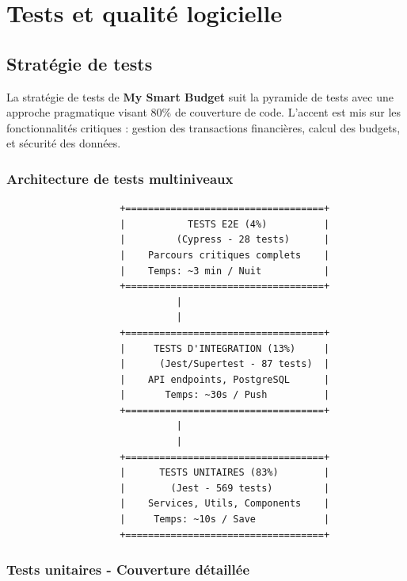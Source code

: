 \chapter{Tests et qualité logicielle}

\section{Stratégie de tests}

La stratégie de tests de \textbf{My Smart Budget} suit la pyramide de tests avec une approche pragmatique visant 80\% de couverture de code. L'accent est mis sur les fonctionnalités critiques : gestion des transactions financières, calcul des budgets, et sécurité des données.

\subsection{Architecture de tests multiniveaux}

\begin{tcolorbox}[colback=blue!5!white,colframe=blue!60!black,title=\textbf{Pyramide de tests My Smart Budget}]
\begin{verbatim}
                    +===================================+
                    |           TESTS E2E (4%)          |
                    |         (Cypress - 28 tests)      |
                    |    Parcours critiques complets    |
                    |    Temps: ~3 min / Nuit           |
                    +===================================+
                              |
                              |
                    +===================================+
                    |     TESTS D'INTEGRATION (13%)     |
                    |      (Jest/Supertest - 87 tests)  |
                    |    API endpoints, PostgreSQL      |
                    |       Temps: ~30s / Push          |
                    +===================================+
                              |
                              |
                    +===================================+
                    |      TESTS UNITAIRES (83%)        |
                    |        (Jest - 569 tests)         |
                    |    Services, Utils, Components    |
                    |     Temps: ~10s / Save            |
                    +===================================+
\end{verbatim}
\end{tcolorbox}

\subsection{Tests unitaires - Couverture détaillée}

